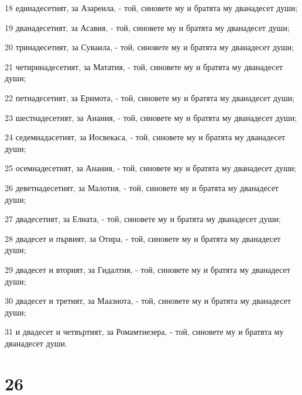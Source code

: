 \par 18 единадесетият, за Азареила, - той, синовете му и братята му дванадесет души;
\par 19 дванадесетият, за Асавия, - той, синовете му и братята му дванадесет души;
\par 20 тринадесетият, за Суваила, - той, синовете му и братята му дванадесет души;
\par 21 четиринадесетият, за Мататия, - той, синовете му и братята му дванадесет души;
\par 22 петнадесетият, за Еримота, - той, синовете му и братята му дванадесет души;
\par 23 шестнадесетият, за Анания, - той, синовете му и братята му дванадесет души;
\par 24 седемнадасетият, за Иосвекаса, - той, синовете му и братята му дванадесет души;
\par 25 осемнадесетият, за Анания, - той, синовете му и братята му дванадесет души;
\par 26 деветнадесетият, за Малотия, - той, синовете му и братята му дванадесет души;
\par 27 двадесетият, за Елиата, - той, синовете му и братята му дванадесет души;
\par 28 двадесет и първият, за Отира, - той, синовете му и братята му дванадесет души;
\par 29 двадесет и вторият, за Гидалтия, - той, синовете му и братята му дванадесет души;
\par 30 двадесет и третият, за Маазиота, - той, синовете му и братята му дванадесет души;
\par 31 и двадесет и четвъртият, за Ромамтиезера, - той, синовете му и братята му дванадесет души.

\chapter{26}

